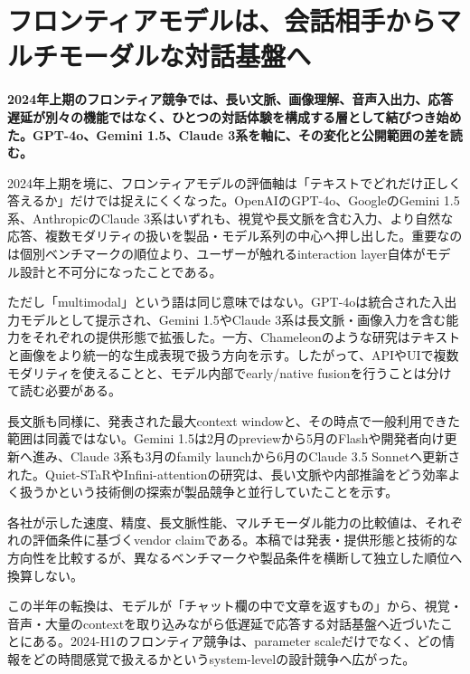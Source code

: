 \section{フロンティアモデルは、会話相手からマルチモーダルな対話基盤へ}
\noindent\textbf{2024年上期のフロンティア競争では、長い文脈、画像理解、音声入出力、応答遅延が別々の機能ではなく、ひとつの対話体験を構成する層として結びつき始めた。GPT-4o、Gemini 1.5、Claude 3系を軸に、その変化と公開範囲の差を読む。}\autocite{src-28ee6f0f00f4,src-2d3a533e91db,src-e91e6f80eaac}

2024年上期を境に、フロンティアモデルの評価軸は「テキストでどれだけ正しく答えるか」だけでは捉えにくくなった。OpenAIのGPT-4o、GoogleのGemini 1.5系、AnthropicのClaude 3系はいずれも、視覚や長文脈を含む入力、より自然な応答、複数モダリティの扱いを製品・モデル系列の中心へ押し出した。重要なのは個別ベンチマークの順位より、ユーザーが触れるinteraction layer自体がモデル設計と不可分になったことである。\autocite{src-28ee6f0f00f4,src-2d3a533e91db,src-e91e6f80eaac}


ただし「multimodal」という語は同じ意味ではない。GPT-4oは統合された入出力モデルとして提示され、Gemini 1.5やClaude 3系は長文脈・画像入力を含む能力をそれぞれの提供形態で拡張した。一方、Chameleonのような研究はテキストと画像をより統一的な生成表現で扱う方向を示す。したがって、APIやUIで複数モダリティを使えることと、モデル内部でearly/native fusionを行うことは分けて読む必要がある。\autocite{src-28ee6f0f00f4,src-2d3a533e91db,src-e1259b3c0804,src-e91e6f80eaac}


長文脈も同様に、発表された最大context windowと、その時点で一般利用できた範囲は同義ではない。Gemini 1.5は2月のpreviewから5月のFlashや開発者向け更新へ進み、Claude 3系も3月のfamily launchから6月のClaude 3.5 Sonnetへ更新された。Quiet-STaRやInfini-attentionの研究は、長い文脈や内部推論をどう効率よく扱うかという技術側の探索が製品競争と並行していたことを示す。\autocite{src-12fa04e64d24,src-28ee6f0f00f4,src-2eb2353f0533,src-e91e6f80eaac}


\begin{claimboundary}
各社が示した速度、精度、長文脈性能、マルチモーダル能力の比較値は、それぞれの評価条件に基づくvendor claimである。本稿では発表・提供形態と技術的な方向性を比較するが、異なるベンチマークや製品条件を横断して独立した順位へ換算しない。\autocite{src-06ed597872be,src-28ee6f0f00f4,src-2d3a533e91db,src-a2cf0d0271ac,src-e91e6f80eaac}
\end{claimboundary}

この半年の転換は、モデルが「チャット欄の中で文章を返すもの」から、視覚・音声・大量のcontextを取り込みながら低遅延で応答する対話基盤へ近づいたことにある。2024-H1のフロンティア競争は、parameter scaleだけでなく、どの情報をどの時間感覚で扱えるかというsystem-levelの設計競争へ広がった。\autocite{src-28ee6f0f00f4,src-2d3a533e91db,src-e1259b3c0804,src-e91e6f80eaac}
